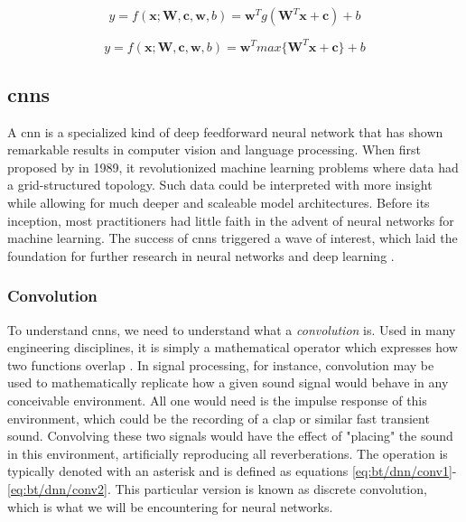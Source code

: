 \begin{equation}
    \label{eq:bt/dnn/mlp2}
    y=f(\bm{x};\bm{W},\bm{c}, \bm{w}, b)=\bm{w}^Tg(\bm{W}^T\bm{x}+\bm{c}) + b
\end{equation}

\begin{equation}
    \label{eq:bt/dnn/mlp3}
    y=f(\bm{x};\bm{W},\bm{c}, \bm{w}, b)=\bm{w}^Tmax\{\bm{W}^T\bm{x}+\bm{c}\} + b
\end{equation}

\newpage
\subsection{\acrlong{cnn}s} \label{sec:bt/DNN/CNN}

A \acrfull{cnn} is a specialized kind of deep feedforward neural network that has shown remarkable results in computer vision and language processing. When first proposed by \textcite{lecun1989} in 1989, it revolutionized machine learning problems where data had a grid-structured topology. Such data could be interpreted with more insight while allowing for much deeper and scaleable model architectures. Before its inception, most practitioners had little faith in the advent of neural networks for machine learning. The success of \acrshort{cnn}s triggered a wave of interest, which laid the foundation for further research in neural networks and deep learning \cite{goodfellow2016}.

\subsubsection{Convolution}

To understand \acrshort{cnn}s, we need to understand what a \textit{convolution} is. Used in many engineering disciplines, it is simply a mathematical operator which expresses how two functions overlap \cite{weisstein2003}. In signal processing, for instance, convolution may be used to mathematically replicate how a given sound signal would behave in any conceivable environment. All one would need is the impulse response of this environment, which could be the recording of a clap or similar fast transient sound. Convolving these two signals would have the effect of "placing" the sound in this environment, artificially reproducing all reverberations. The operation is typically denoted with an asterisk and is defined as equations \ref{eq:bt/dnn/conv1}-\ref{eq:bt/dnn/conv2}. This particular version is known as discrete convolution, which is what we will be encountering for neural networks.

